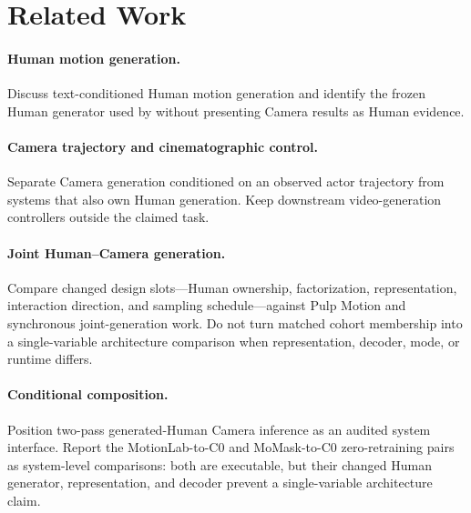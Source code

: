 \section{Related Work}

\paragraph{Human motion generation.}
Discuss text-conditioned Human motion generation and identify the frozen Human generator used
by \storymotion{} without presenting Camera results as Human evidence.

\paragraph{Camera trajectory and cinematographic control.}
Separate Camera generation conditioned on an observed actor trajectory from systems that also
own Human generation. Keep downstream video-generation controllers outside the claimed task.

\paragraph{Joint Human--Camera generation.}
Compare changed design slots---Human ownership, factorization, representation, interaction
direction, and sampling schedule---against Pulp Motion and synchronous joint-generation work.
Do not turn matched cohort membership into a single-variable architecture comparison when
representation, decoder, mode, or runtime differs.

\paragraph{Conditional composition.}
Position two-pass generated-Human Camera inference as an audited system interface. Report the
MotionLab-to-C0 and MoMask-to-C0 zero-retraining pairs as system-level comparisons: both are
executable, but their changed Human generator, representation, and decoder prevent a
single-variable architecture claim.

